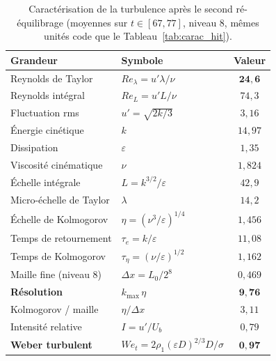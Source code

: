 \begin{table}[H]
    \centering
    \caption{Caractérisation de la turbulence après le second ré-équilibrage
    (moyennes sur $t \in [67, 77]$, niveau 8, mêmes unités code que le
    Tableau~\ref{tab:carac_hit}).}
    \label{tab:carac_we1}
    \begin{tabular}{@{}llc@{}}
    \toprule
    \textbf{Grandeur} & \textbf{Symbole} & \textbf{Valeur} \\ \midrule
    Reynolds de Taylor          & $Re_\lambda = u'\lambda/\nu$      & $\mathbf{24{,}6}$ \\
    Reynolds intégral           & $Re_L = u'L/\nu$                  & $74{,}3$ \\
    Fluctuation rms             & $u' = \sqrt{2k/3}$                & $3{,}16$ \\
    Énergie cinétique           & $k$                               & $14{,}97$ \\
    Dissipation                 & $\varepsilon$                     & $1{,}35$ \\
    Viscosité cinématique       & $\nu$                             & $1{,}824$ \\ \midrule
    Échelle intégrale           & $L = k^{3/2}/\varepsilon$         & $42{,}9$ \\
    Micro-échelle de Taylor     & $\lambda$                         & $14{,}2$ \\
    Échelle de Kolmogorov       & $\eta = (\nu^3/\varepsilon)^{1/4}$& $1{,}456$ \\
    Temps de retournement       & $\tau_e = k/\varepsilon$          & $11{,}08$ \\
    Temps de Kolmogorov         & $\tau_\eta = (\nu/\varepsilon)^{1/2}$ & $1{,}162$ \\ \midrule
    Maille fine (niveau 8)      & $\Delta x = L_0/2^8$              & $0{,}469$ \\
    \textbf{Résolution}         & $k_{\max}\,\eta$                  & $\mathbf{9{,}76}$ \\
    Kolmogorov / maille         & $\eta/\Delta x$                   & $3{,}11$ \\ \midrule
    Intensité relative          & $I = u'/U_b$                      & $0{,}79$ \\
    \textbf{Weber turbulent}    & $We_t = 2\rho_1(\varepsilon D)^{2/3}D/\sigma$ & $\mathbf{0{,}97}$ \\
    \bottomrule
    \end{tabular}
\end{table}

